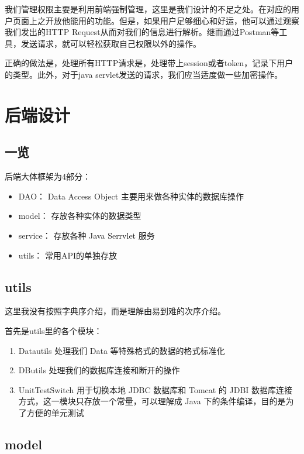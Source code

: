\documentclass[../report.tex]{subfiles}
\begin{document}
我们管理权限主要是利用前端强制管理，这里是我们设计的不足之处。在对应的用户页面上之开放他能用的功能。但是，如果用户足够细心和好运，他可以通过观察我们发出的HTTP Request从而对我们的信息进行解析。继而通过Postman等工具，发送请求，就可以轻松获取自己权限以外的操作。

正确的做法是，处理所有HTTP请求是，处理带上session或者token，记录下用户的类型。此外，对于java servlet发送的请求，我们应当适度做一些加密操作。

\section{后端设计}

\subsection{一览}

后端大体框架为4部分：
\begin{itemize}
\itemsep -0.3em
\item DAO： Data Access Object 主要用来做各种实体的数据库操作 
\item model： 存放各种实体的数据类型
\item service： 存放各种 Java Serrvlet 服务
\item utils： 常用API的单独存放
\end{itemize}

\subsection{utils}

这里我没有按照字典序介绍，而是理解由易到难的次序介绍。

首先是utils里的各个模块：

\begin{enumerate}
\itemsep 0em
\item Datautils 处理我们 Data 等特殊格式的数据的格式标准化
\item DButils 处理我们的数据库连接和断开的操作
\item UnitTestSwitch 用于切换本地 JDBC 数据库和 Tomcat 的 JDBI 数据库连接方式，这一模块只存放一个常量，可以理解成 Java 下的条件编译，目的是为了方便的单元测试
\end{enumerate}

\subsection{model}
\end{document}
